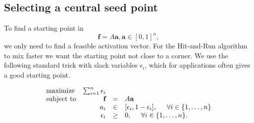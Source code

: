 \subsection{Selecting a central seed point}
To find a starting point in 
\[\textbf{f} = A\textbf{a}, \textbf{a} \in [0,1]^n,\]
we only need to find a feasible activation vector. For the Hit-and-Run algorithm to mix faster we want the starting point not close to a corner. %
We use the following standard trick with slack variables $\epsilon_i$, which for applications often gives a good starting point.%

\begin{equation}\label{eq:LP_r}
\begin{array}{lrcl}
\mbox{maximize} & \sum_{i=1}^n \epsilon_i \\ 
\mbox{subject to} & \textbf{f} &=& A\textbf{a}\\
  & a_i &\in& [\epsilon_i, 1- \epsilon_i], \hspace{5mm} \forall i \in \{1,\dots,n\}  \\
  & \epsilon_i &\geq& 0, \hspace{5mm} \forall i \in \{1,\dots,n\}.  
\end{array}
\end{equation}





